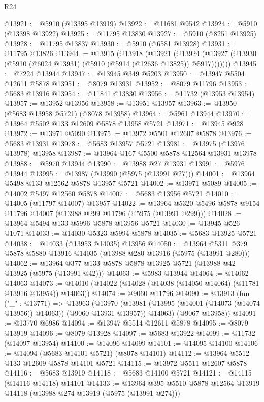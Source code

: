 \begin{lexlean}{R24}
\begin{coremodule}
@13921 := @5910 (@13395 @13919)
@13922 := @11681 @9542
@13924 := @5910 (@13398 @13922)
@13925 := @11795 @13830
@13927 := @5910 (@8251 @13925)
@13928 := @11795 @13837
@13930 := @5910 (@6581 @13928)
@13931 := @11795 @13826
@13944 := @13915
    (@13918
      (@13921
        (@13924 (@13927 (@13930 (@5910 (@6024 @13931) (@5910 (@5914 (@12636 @13825)) @5917)))))))
@13945 := @7224 @13944
@13947 := @13945 @349 @5203
@13950 := @13947 @5504 @12611 @5878
@13951 := @8079 @13931
@13952 := @8079 @11796
@13953 := @5683 @13916
@13954 := @11841 @13830
@13956 := @11732 (@13953 @13954)
@13957 := @13952 @13956
@13958 := @13951 @13957
@13963 := @13950 (@5683 @13958 @5721) (@8078 @13958)
@13964 := @5961 @13944
@13970 := @13964 @5502 @133 @12609 @5878 @13958 @5721
@13971 := @13945 @928
@13972 := @13971 @5090
@13975 := @13972 @5501 @12607 @5878
@13976 := @5683 @13931
@13978 := @5683 @13957 @5721
@13981 := @13975 (@13976 @13978) @13958
@13987 := @13964 @167 @5500 @5878 @12564 @13931 @13978
@13988 := @5970 @13944
@13990 := @13988 @27 @13931
@13991 := @5976 @13944
@13995 := @13987 (@13990 (@5975 (@13991 @27)))
@14001 := @13964 @5498 @133 @12562 @5878 @13957 @5721
@14002 := @13971 @5089
@14005 := @14002 @5497 @12560 @5878
@14007 := @5683 @13956 @5721
@14010 := @14005 (@11797 @14007) @13957
@14022 := @13964 @5320 @5496 @5878 @9154 @11796 @14007 (@13988 @299 @11796 (@5975 (@13991 @299)))
@14028 := @13964 @5494 @133 @5996 @5878 @13956 @5721
@14030 := @13945 @526 @1071
@14033 := @14030 @5323 @5994 @5878
@14035 := @5683 @13925 @5721
@14038 := @14033 (@13953 @14035) @13956
@14050 := @13964 @5311 @379 @5878 @5880 @13916 @14035 (@13988 @280 @13916 (@5975 (@13991 @280)))
@14062 := @13964 @377 @133 @5878 @5878 @13925 @5721 (@13988 @42 @13925 (@5975 (@13991 @42)))
@14063 := @5983 @13944
@14064 := @14062 @14063
@14073 := @14010 (@14022 (@14028 (@14038 (@14050 @14064) (@11781 @13916 @13954)) @14063))
@14074 := @9060 @11796
@14090 := @13913
    (fun ("_" : @13771) =>
    @13963
      (@13970
        (@13981 (@13995 (@14001 (@14073 (@14074 @13956)) @14063)) (@9060 @13931 @13957))
        @14063)
      (@9067 @13958))
@14091 := @13770 @6986
@14094 := @13947 @5514 @12611 @5878
@14095 := @8079 @13919
@14096 := @8079 @13928
@14097 := @5683 @13922
@14099 := @11732 (@14097 @13954)
@14100 := @14096 @14099
@14101 := @14095 @14100
@14106 := @14094 (@5683 @14101 @5721) (@8078 @14101)
@14112 := @13964 @5512 @133 @12609 @5878 @14101 @5721
@14115 := @13972 @5511 @12607 @5878
@14116 := @5683 @13919
@14118 := @5683 @14100 @5721
@14121 := @14115 (@14116 @14118) @14101
@14133 := @13964 @395 @5510 @5878 @12564 @13919 @14118 (@13988 @274 @13919 (@5975 (@13991 @274)))

\end{coremodule}
\end{lexlean}
